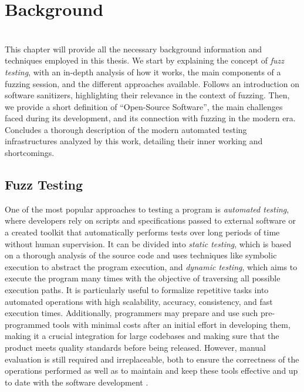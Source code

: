 \chapter{Background} \label{chap_2}
\ \\

This chapter will provide all the necessary background information and techniques employed in this thesis.
We start by explaining the concept of \textit{fuzz testing}, with an in-depth analysis of how it works, the main components of a fuzzing session, and the different approaches available.
Follows an introduction on software sanitizers, highlighting their relevance in the context of fuzzing.
Then, we provide a short definition of ``Open-Source Software'', the main challenges faced during its development, and its connection with fuzzing in the modern era.
Concludes a thorough description of the modern automated testing infrastructures analyzed by this work, detailing their inner working and shortcomings.







\section{Fuzz Testing}
One of the most popular approaches to testing a program is \textit{automated testing}, where developers rely on scripts and specifications passed to external software or a created toolkit that automatically performs tests over long periods of time without human supervision. It can be divided into \textit{static testing}, which is based on a thorough analysis of the source code and uses techniques like symbolic execution to abstract the program execution, and \textit{dynamic testing}, which aims to execute the program many times with the objective of traversing all possible execution paths. It is particularly useful to formalize repetitive tasks into automated operations with high scalability, accuracy, consistency, and fast execution times. Additionally, programmers may prepare and use such pre-programmed tools with minimal costs after an initial effort in developing them, making it a crucial integration for large codebases and making sure that the product meets quality standards before being released. However, manual evaluation is still required and irreplaceable, both to ensure the correctness of the operations performed as well as to maintain and keep these tools effective and up to date with the software development \cite{automated_testing}.  


